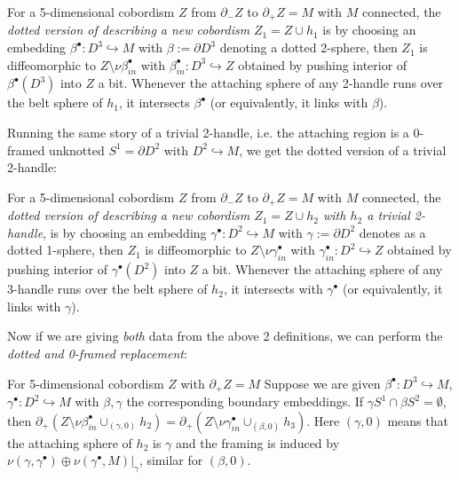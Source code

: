\begin{definition}
    For a 5-dimensional cobordism $Z$ from $\partial_- Z$ to $\partial_+ Z=M$ with $M$ connected, the \emph{dotted version of describing a new cobordism} $Z_1=Z\cup h_1$ is by choosing an embedding $\beta^\bullet :D^3\hookrightarrow M$ with $\beta:=\partial D^3$ denoting a dotted 2-sphere, then $Z_1$ is diffeomorphic to $Z\setminus \nu \beta^\bullet _{in}$ with $\beta_{in}^\bullet : D^3\hookrightarrow Z$ obtained by pushing interior of $\beta^\bullet (D^3)$ into $Z$ a bit. Whenever the attaching sphere of any 2-handle runs over the belt sphere of $h_1$, it intersects $\beta^\bullet$ (or equivalently, it links with $\beta$).
\end{definition}

Running the same story of a trivial 2-handle, i.e. the attaching region is a 0-framed unknotted $S^1=\partial D^2$ with $D^2\hookrightarrow M$, we get the dotted version of a trivial 2-handle:

\begin{definition}
    For a 5-dimensional cobordism $Z$ from $\partial_- Z$ to $\partial_+ Z=M$ with $M$ connected, the \emph{dotted version of describing a new cobordism $Z_1=Z\cup h_2$ with $h_2$ a trivial 2-handle}, is by choosing an embedding $\gamma^\bullet :D^2\hookrightarrow M$ with $\gamma:=\partial D^2$ denotes as a dotted 1-sphere, then $Z_1$ is diffeomorphic to $Z\setminus \nu \gamma^\bullet _{in}$ with $\gamma^\bullet_{in}: D^2\hookrightarrow Z$ obtained by pushing interior of $\gamma^\bullet (D^2)$ into $Z$ a bit. Whenever the attaching sphere of any 3-handle runs over the belt sphere of $h_2$, it intersects with $\gamma^\bullet$ (or equivalently, it links with $\gamma$).
\end{definition}

Now if we are giving \emph{both} data from the above 2 definitions, we can perform the \emph{dotted and 0-framed replacement}:

\begin{proposition}
    For 5-dimensional cobordism $Z$ with $\partial_+ Z=M$ Suppose we are given $\beta^\bullet: D^3\hookrightarrow M$, $\gamma^\bullet: D^2\hookrightarrow M$ with $\beta,\gamma$ the corresponding boundary embeddings. If $\gamma S^1\cap \beta S^2=\emptyset$, then $\partial_+(Z\setminus \nu \beta^\bullet_{in} \cup _{(\gamma, 0)}  h_2)=\partial_+(Z\setminus \nu \gamma^\bullet _{in} \cup_{(\beta, 0)} h_3)  $. Here $(\gamma, 0)$ means that the attaching sphere of $h_2$ is $\gamma$ and the framing is induced by $\nu (\gamma, \gamma^\bullet)\oplus \nu (\gamma^\bullet, M)|_{\gamma}$, similar for $(\beta,0)$.
\end{proposition}

